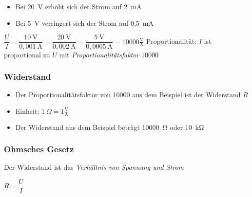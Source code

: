 \begin{frame}\begin{itemize}
  \item Bei 20 V erhöht sich der Strom auf 2 mA
  \item Bei 5 V verringert sich der Strom auf 0,5 mA
  \end{itemize}
    \pause
    $\dfrac{U}{I} = \dfrac{10 \ \text{V}}{0,001 \ \text{A}} = \dfrac{20 \ \text{V}}{0,002 \ \text{A}} = \dfrac{5 \ \text{V}}{0,0005 \ \text{A}} = 10000 \frac{\text{V}}{\text{A}}$
    \pause
    Proportionalität: $I$ ist proportional zu $U$ mit \emph{Proportionalitätsfaktor} 10000

\end{frame}

\begin{frame}
\frametitle{Widerstand}
\begin{itemize}
  \item Der Proportionalitätsfaktor von 10000 aus dem Beispiel ist der Widerstand $R$
  \item Einheit: $1 \ Ω = 1 \frac{\text{V}}{\text{A}}$
  \item Der Widerstand aus dem Beispiel beträgt 10000 Ω oder 10 kΩ
  \end{itemize}
\end{frame}

\begin{frame}
\frametitle{Ohmsches Gesetz}
Der Widerstand ist das \emph{Verhältnis von Spannung und Strom}

$ R = \dfrac{U}{I} $

\end{frame}

\begin{frame}
\end{frame}

